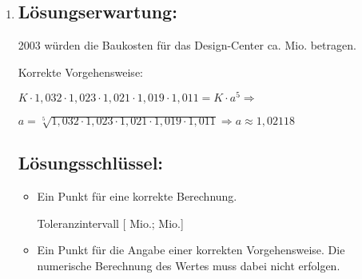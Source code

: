\begin{langesbeispiel}
{\begin{enumerate}
	oder:\leer
	
	$f(x)\approx -0,01\cdot x²+13$
	
	Durch den angegebenen Term wird das (umbaute) Volumen des Design-Centers berechnet.
		
	\subsection{Lösungsschlüssel:}
	\begin{itemize}
		\item Ein Ausgleichspunkt für das Aufstellen einer korrekten Funktionsgleichung. Äquivalente Funktionsgleichungen sind ebenfalls als richtig zu werten.  
		
		Die Aufgabe ist auch dann als richtig gelöst zu werten, wenn bei korrektem Ansatz das Ergebnis aufgrund eines Rechenfehlers nicht richtig ist.
		\item  Ein Punkt für eine (sinngemäß) korrekte Deutung.
	\end{itemize}
	
	\item \subsection{Lösungserwartung:}
			
		2003 würden die Baukosten für das Design-Center ca.  Mio. betragen.\leer
		
		Korrekte Vorgehensweise:
		
		$K\cdot 1,032\cdot 1,023\cdot 1,021\cdot 1,019\cdot 1,011=K\cdot a^5 \Rightarrow$
		
		$a=\sqrt[5]{1,032\cdot 1,023\cdot 1,021\cdot 1,019\cdot 1,011} \Rightarrow a\approx 1,02118$

	\subsection{Lösungsschlüssel:}
	
\begin{itemize}
	\item Ein Punkt für eine korrekte Berechnung.
	
	Toleranzintervall [ Mio.;  Mio.]
	\item Ein Punkt für die Angabe einer korrekten Vorgehensweise. Die numerische Berechnung des Wertes muss dabei nicht erfolgen. 
\end{itemize}

\end{enumerate}}
		\end{langesbeispiel}